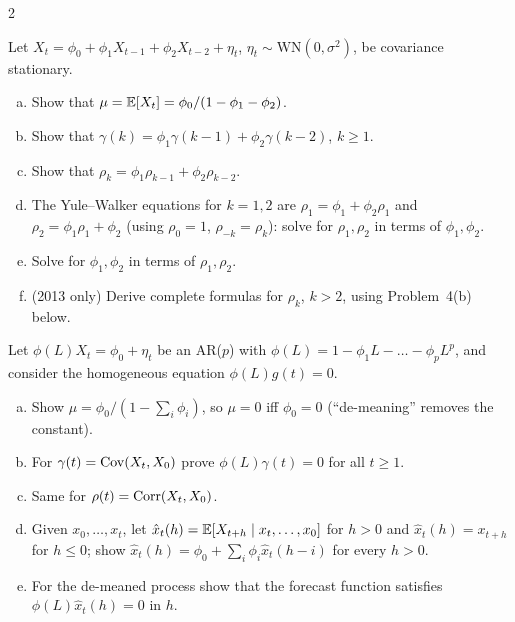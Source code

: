 \begin{paracol}{2}
\begin{exercise}\label{ch09:ex-ps4-1}
Let $X_t=\phi_0+\phi_1X_{t-1}+\phi_2X_{t-2}+\eta_t$, $\eta_t\sim\mathrm{WN}(0,\sigma^2)$, be covariance stationary.
\begin{enumerate}[(a)]
  \item Show that $\mu=\mathbb{E}[X_t]=\phi_0/(1-\phi_1-\phi_2)$.
  \item Show that $\gamma(k)=\phi_1\gamma(k-1)+\phi_2\gamma(k-2)$, $k\ge1$.
  \item Show that $\rho_k=\phi_1\rho_{k-1}+\phi_2\rho_{k-2}$.
  \item The Yule--Walker equations for $k=1,2$ are $\rho_1=\phi_1+\phi_2\rho_1$ and $\rho_2=\phi_1\rho_1+\phi_2$ (using $\rho_0=1$, $\rho_{-k}=\rho_k$): solve for $\rho_1,\rho_2$ in terms of $\phi_1,\phi_2$.
  \item Solve for $\phi_1,\phi_2$ in terms of $\rho_1,\rho_2$.
  \item (2013 only) Derive complete formulas for $\rho_k$, $k>2$, using Problem~4(b) below.
\end{enumerate}
\end{exercise}

\begin{exercise}\label{ch09:ex-ps4-2}
Let $\phi(L)X_t=\phi_0+\eta_t$ be an AR($p$) with $\phi(L)=1-\phi_1L-\dots-\phi_pL^p$, and consider the homogeneous equation $\phi(L)g(t)=0$.
\begin{enumerate}[(a)]
  \item Show $\mu=\phi_0/(1-\sum_i\phi_i)$, so $\mu=0$ iff $\phi_0=0$
      (``de-meaning'' removes the constant).
  \item For $\gamma(t)=\operatorname{Cov}(X_t,X_0)$ prove $\phi(L)\gamma(t)=0$ for all $t\ge1$.
  \item Same for $\rho(t)=\operatorname{Corr}(X_t,X_0)$.
  \item Given $x_0,\dots,x_t$, let $\hat x_t(h)=\mathbb{E}[X_{t+h}\mid x_t,\dots,x_0]$ for $h>0$
      and $\hat x_t(h)=x_{t+h}$ for $h\le0$; show $\hat x_t(h)=\phi_0+\sum_i\phi_i\hat x_t(h-i)$ for every $h>0$.
  \item For the de-meaned process show that the forecast function satisfies $\phi(L)\hat x_t(h)=0$ in $h$.
\end{enumerate}
\end{exercise}


\end{paracol}
